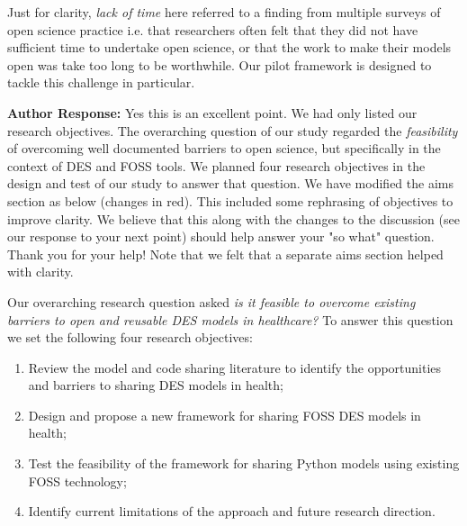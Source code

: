 \documentclass{article}
\begin{document}
\vspace{0.2cm}

Just for clarity, \textit{lack of time} here referred to a finding from multiple surveys of open science practice i.e. that researchers often felt that they did not have sufficient time to undertake open science, or that the work to make their models open was take too long to be worthwhile. Our pilot framework is designed to tackle this challenge in particular.


\vspace{0.5cm}


\vspace{0.2cm}

\noindent\textbf{Author Response:} Yes this is an excellent point. We had only listed our research objectives.  The overarching question of our study regarded the \textit{feasibility} of overcoming well documented barriers to open science, but specifically in the context of DES and FOSS tools.  We planned four research objectives in the design and test of our study to answer that question. We have modified the aims section as below (changes in red).  This included some rephrasing of objectives to improve clarity.  We believe that this along with the changes to the discussion (see our response to your next point) should help answer your "so what" question. Thank you for your help!  Note that we felt that a separate aims section helped with clarity.

\vspace{0.2cm}

{\color{red}Our overarching research question asked \textit{is it feasible to overcome existing barriers to open and reusable DES models in healthcare?}  To answer this question we set the following four research objectives:}

\label{sec:aims}
\begin{enumerate}
    \item {\color{red}Review the model and code sharing literature to identify the opportunities and barriers to sharing DES models in health;}
    \item {\color{red}Design and propose a new framework for sharing FOSS DES models in health;}
    \item Test the feasibility of the framework for sharing Python models using existing FOSS technology;
    \item Identify current limitations of the approach and future research direction.  
\end{enumerate}
\end{document}
